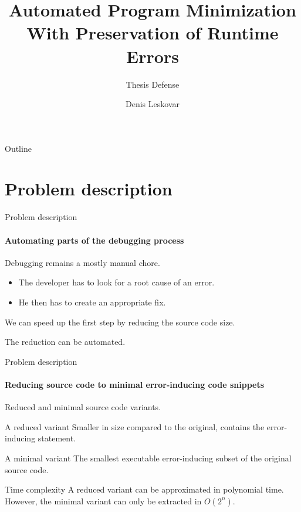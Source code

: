 \documentclass{beamer}
\title{Automated Program Minimization \protect\\ With Preservation of Runtime Errors} %
\subtitle{Thesis Defense} %
\author{Denis Leskovar}
\begin{document}
  \shorthandoff{-}
  \frame[c]{\maketitle}

\begin{frame}{Outline}
    \tableofcontents[]
\end{frame}

\section{Problem description}

    \begin{frame}{Problem description}
      \framesubtitle{Automating parts of the debugging process}
      Debugging remains a mostly manual chore.\\
      \begin{itemize}
          \item The developer has to look for a root cause of an error.\\
          \item He then has to create an appropriate fix.\\
      \end{itemize}
      
      \bigskip

      We can speed up the first step by reducing the source code size.\\
      
      \bigskip
      \bigskip
      
      The \alert{reduction} can be \alert{automated}.
    \end{frame}

    \begin{frame}{Problem description}
      \framesubtitle{Reducing source code to \alert{minimal} error-inducing code snippets}
      Reduced and minimal source code variants.

      \begin{block}{A reduced variant}
        Smaller in size compared to the original, contains the error-inducing statement.
      \end{block}
      \begin{block}{A minimal variant}
        The \alert{smallest} executable error-inducing \alert{subset} of the original source code.
      \end{block}
      \begin{alertblock}{Time complexity}
        A reduced variant can be approximated in polynomial time. However, the minimal variant can only be extracted in $O(2^n)$.
      \end{alertblock}
    \end{frame}
\end{document}
